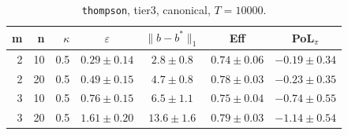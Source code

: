 \begin{table}[htbp]
\centering
\scriptsize
\caption{\texttt{thompson}, tier3, canonical, $T=10000$.}
\label{tab:tier3_long_thompson}
\begin{tabular}{@{}rrrcccc@{}}
\toprule
m & n & $\kappa$ & $\varepsilon$ & $\|b-b^*\|_1$ & Eff & PoL$_\pi$ \\
\midrule
2 & 10 & 0.5 & $0.29 \pm 0.14$ & $2.8 \pm 0.8$ & $0.74 \pm 0.06$ & $-0.19 \pm 0.34$ \\
2 & 20 & 0.5 & $0.49 \pm 0.15$ & $4.7 \pm 0.8$ & $0.78 \pm 0.03$ & $-0.23 \pm 0.35$ \\
\midrule
3 & 10 & 0.5 & $0.76 \pm 0.15$ & $6.5 \pm 1.1$ & $0.75 \pm 0.04$ & $-0.74 \pm 0.55$ \\
3 & 20 & 0.5 & $1.61 \pm 0.20$ & $13.6 \pm 1.6$ & $0.79 \pm 0.03$ & $-1.14 \pm 0.54$ \\
\bottomrule
\end{tabular}
\end{table}
